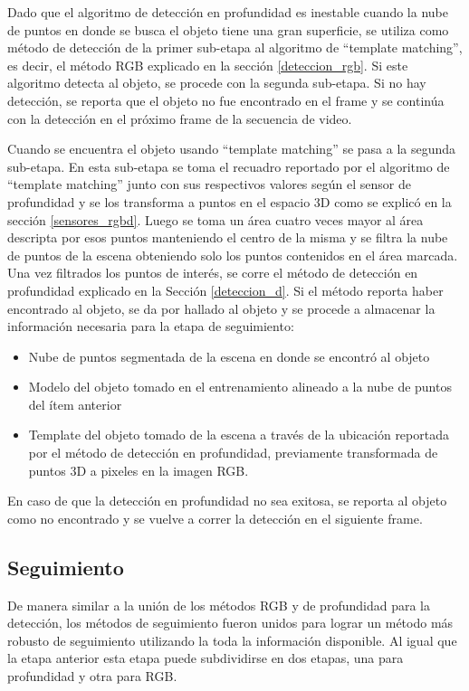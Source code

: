 Dado que el algoritmo de detección en profundidad es inestable cuando la nube de puntos en donde se busca el objeto tiene una gran superficie, se utiliza como método de detección de la primer sub-etapa al algoritmo de ``template matching'', es decir, el método RGB explicado en la sección \ref{deteccion_rgb}. Si este algoritmo detecta al objeto, se procede con la segunda sub-etapa. Si no hay detección, se reporta que el objeto no fue encontrado en el frame y se continúa con la detección en el próximo frame de la secuencia de video.

Cuando se encuentra el objeto usando ``template matching'' se pasa a la segunda sub-etapa. En esta sub-etapa se toma el recuadro reportado por el algoritmo de ``template matching'' junto con sus respectivos valores según el sensor de profundidad y se los transforma a puntos en el espacio 3D como se explicó en la sección \ref{sensores_rgbd}. Luego se toma un área cuatro veces mayor al área descripta por esos puntos manteniendo el centro de la misma y se filtra la nube de puntos de la escena obteniendo solo los puntos contenidos en el área marcada. Una vez filtrados los puntos de interés, se corre el método de detección en profundidad explicado en la Sección \ref{deteccion_d}. Si el método reporta haber encontrado al objeto, se da por hallado al objeto y se procede a almacenar la información necesaria para la etapa de seguimiento:
\begin{itemize}
	\item Nube de puntos segmentada de la escena en donde se encontró al objeto
	\item Modelo del objeto tomado en el entrenamiento alineado a la nube de puntos del ítem anterior
	\item Template del objeto tomado de la escena a través de la ubicación reportada por el método de detección en profundidad, previamente transformada de puntos 3D a pixeles en la imagen RGB.
\end{itemize}

En caso de que la detección en profundidad no sea exitosa, se reporta al objeto como no encontrado y se vuelve a correr la detección en el siguiente frame.


\subsection{Seguimiento}\label{tracking_rgbd}
De manera similar a la unión de los métodos RGB y de profundidad para la detección, los métodos de seguimiento fueron unidos para lograr un método más robusto de seguimiento utilizando la toda la información disponible. Al igual que la etapa anterior esta etapa puede subdividirse en dos etapas, una para profundidad y otra para RGB.

